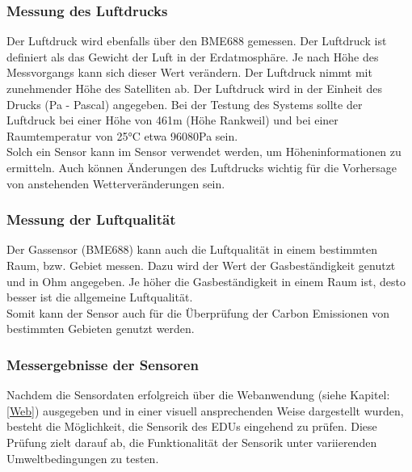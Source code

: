 \newpage
\subsubsection{Messung des Luftdrucks}
Der Luftdruck wird ebenfalls über den BME688 gemessen. Der Luftdruck ist definiert als das Gewicht der Luft in der Erdatmosphäre. Je nach Höhe des Messvorgangs kann sich dieser Wert verändern. Der Luftdruck nimmt mit zunehmender Höhe des Satelliten ab. Der Luftdruck wird in der Einheit des Drucks (Pa - Pascal) angegeben. Bei der Testung des Systems sollte der Luftdruck bei einer Höhe von 461m (Höhe Rankweil) und bei einer Raumtemperatur von 25°C etwa 96080Pa sein.\\
\vspace{3mm}
Solch ein Sensor kann im Sensor verwendet werden, um Höheninformationen zu ermitteln. Auch können Änderungen des Luftdrucks wichtig für die Vorhersage von anstehenden Wetterveränderungen sein. 

\subsubsection{Messung der Luftqualität }
Der Gassensor (BME688) kann auch die Luftqualität in einem bestimmten Raum, bzw. Gebiet messen. Dazu wird der Wert der Gasbeständigkeit genutzt und in Ohm angegeben. Je höher die Gasbeständigkeit in einem Raum ist, desto besser ist die allgemeine Luftqualität.\\
\vspace{3mm}
Somit kann der Sensor auch für die Überprüfung der Carbon Emissionen von bestimmten Gebieten genutzt werden. 

\subsubsection{Messergebnisse der Sensoren}
Nachdem die Sensordaten erfolgreich über die Webanwendung (siehe Kapitel: \ref{Web}) ausgegeben und in einer visuell ansprechenden Weise dargestellt wurden, besteht die Möglichkeit, die Sensorik des EDUs eingehend zu prüfen. Diese Prüfung zielt darauf ab, die Funktionalität der Sensorik unter variierenden Umweltbedingungen zu testen. 

